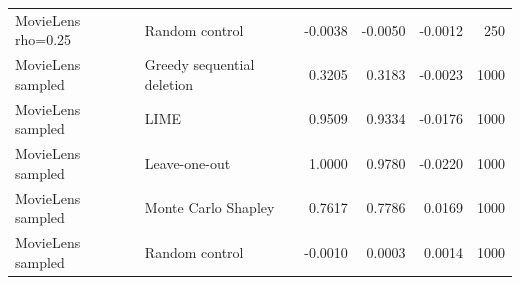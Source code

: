 \begin{longtable}{@{}p{.24\linewidth}p{.17\linewidth}rrrr@{}}
MovieLens rho=0.25 & Random control & -0.0038 & -0.0050 & -0.0012 & 250 \\
MovieLens sampled & Greedy sequential deletion & 0.3205 & 0.3183 & -0.0023 & 1000 \\
MovieLens sampled & LIME & 0.9509 & 0.9334 & -0.0176 & 1000 \\
MovieLens sampled & Leave-one-out & 1.0000 & 0.9780 & -0.0220 & 1000 \\
MovieLens sampled & Monte Carlo Shapley & 0.7617 & 0.7786 & 0.0169 & 1000 \\
MovieLens sampled & Random control & -0.0010 & 0.0003 & 0.0014 & 1000 \\
\end{longtable}
